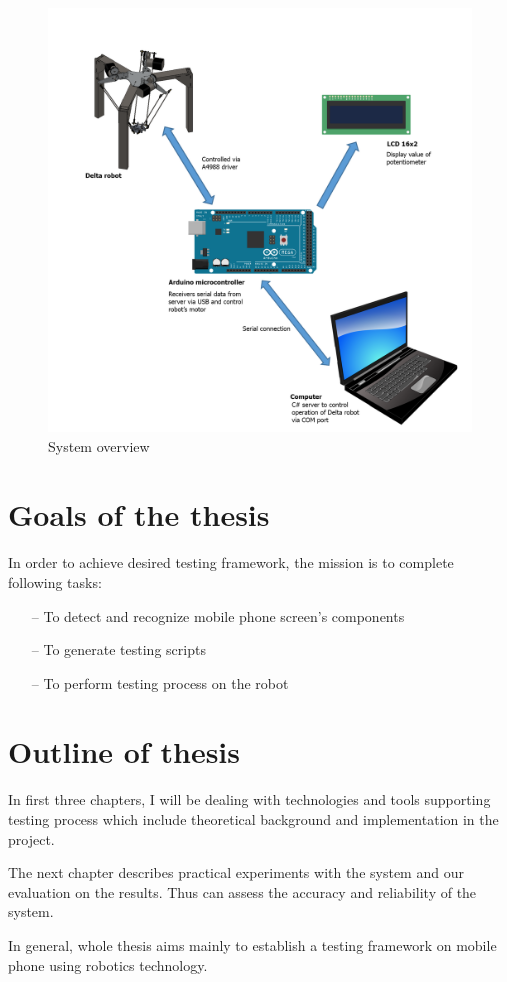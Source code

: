 \begin{figure}[H]
	\centering
	\includegraphics[width=\maxwidth{17cm}, keepaspectratio]{Chapters/Fig/system_overview.png}
	\caption{System overview}
	\label{fig:system_overview}
\end{figure}

\section{Goals of the thesis}
In order to achieve desired testing framework, the mission is to complete following tasks:
	\begin{itemize}
		\item[--] To detect and recognize mobile phone screen's components
		\item[--] To generate testing scripts
		\item[--] To perform testing process on the robot
	\end{itemize}

\section{Outline of thesis}
In first three chapters, I will be dealing with technologies and tools supporting testing process which include theoretical background and implementation in the project.

The next chapter describes practical experiments with the system and our evaluation on the results. Thus can assess the accuracy and reliability of the system.

In general, whole thesis aims mainly to establish a testing framework on mobile phone using robotics technology. \nocite{radim_thesis}